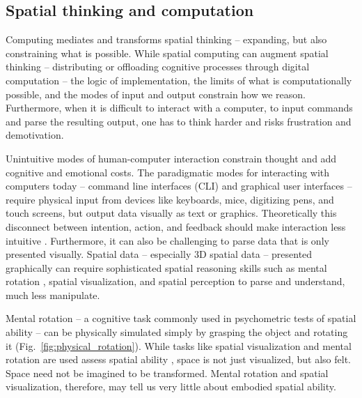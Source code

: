 \subsection{Spatial thinking and computation} %

Computing mediates and transforms spatial thinking -- expanding, but also constraining what is possible.
%
While spatial computing can augment spatial thinking 
-- distributing or offloading cognitive processes through digital computation -- 
the logic of implementation,
the limits of what is computationally possible, 
and the modes of input and output
constrain how we reason. %
%
Furthermore, 
when it is difficult to interact with a computer, 
to input commands and parse the resulting output, 
one has to think harder 
and risks frustration and demotivation. %

Unintuitive modes of human-computer interaction constrain thought and add cognitive and emotional costs. 
%
The paradigmatic modes for interacting with computers today 
-- command line interfaces (CLI) and
graphical user interfaces
 -- 
require physical input from devices like keyboards, mice, digitizing pens, and touch screens, but
output %
data visually as text or graphics. 
%
Theoretically this disconnect between intention, action, and feedback should make interaction less intuitive \cite{Dourish2001,Ishii2008}. 
%
Furthermore, it can also be challenging to parse data that is only presented visually. 
Spatial data -- especially 3D spatial data -- presented graphically can require sophisticated spatial reasoning skills such as mental rotation \cite{Shepard1971}, spatial visualization, and spatial perception \cite{Linn1985} to parse and understand, much less manipulate. 


%
%


Mental rotation 
-- a cognitive task commonly used in psychometric tests of spatial ability -- 
can be physically simulated 
simply by grasping the object and rotating it (Fig.~\ref{fig:physical_rotation}).
%
While tasks like spatial visualization and mental rotation are used assess spatial ability
\cite{Uttal2013a,Uttal2013,Ormand2014}, 
space is not just visualized, but also felt.
Space need not be imagined to be transformed. 
Mental rotation and spatial visualization, therefore, 
may tell us very little about embodied spatial ability. 






